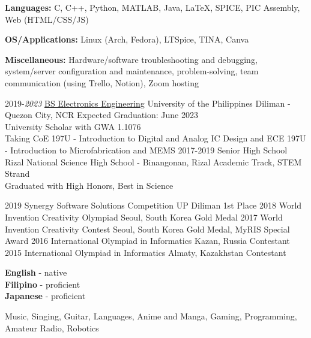 \documentclass[9pt]{developercv}
\begin{document}
\begin{minipage}[t]{0.475\textwidth} 
	\vspace{-\baselineskip}


	\textbf{Languages:} C, C++, Python, MATLAB, Java, LaTeX, SPICE, PIC Assembly, Web (HTML/CSS/JS)

	\textbf{OS/Applications:} Linux (Arch, Fedora), LTSpice, TINA, Canva

	\textbf{Miscellaneous:} Hardware/software troubleshooting and debugging, system/server configuration and maintenance, problem-solving, team communication (using Trello, Notion), Zoom hosting

	
	\begin{entrylist}
		\entry
			{2019-\emph{2023}}
			{\href{https://www.eee.upd.edu.ph/undergraduate-programs/bs-electronics-and-communications-engineering}{BS Electronics Engineering}}
			{University of the Philippines Diliman - Quezon City, NCR}
			{Expected Graduation: June 2023\\
			University Scholar with GWA 1.1076\\
			Taking CoE 197U - Introduction to Digital and Analog IC Design and ECE 197U - Introduction to Microfabrication and MEMS}
		\entry
			{2017-2019}
			{Senior High School}
			{Rizal National Science High School - Binangonan, Rizal}
			{Academic Track, STEM Strand\\
			Graduated with High Honors, Best in Science}
	\end{entrylist}
	\cvsect{Achievements}
	\begin{entrylist}
		\entry
			{2019}
			{Synergy Software Solutions Competition}
			{UP Diliman}
			{1st Place}
		\entry
			{2018}
			{World Invention Creativity Olympiad}
			{Seoul, South Korea}
			{Gold Medal}
		\entry
			{2017}
			{World Invention Creativity Contest}
			{Seoul, South Korea}
			{Gold Medal, MyRIS Special Award}
		\entry
			{2016}
			{International Olympiad in Informatics}
			{Kazan, Russia}
			{Contestant}
		\entry
			{2015}
			{International Olympiad in Informatics}
			{Almaty, Kazakhstan}
			{Contestant}
	\end{entrylist}
\end{minipage}

\vspace{0.5cm}

\begin{minipage}[t]{0.2\textwidth}
	\vspace{-\baselineskip}

	\textbf{English} - native\\
	\textbf{Filipino} - proficient\\
	\textbf{Japanese} - proficient\\
\end{minipage}
\hfill
\begin{minipage}[t]{0.6\textwidth}
	\vspace{-\baselineskip}
	
	Music, Singing, Guitar, Languages, Anime and Manga, Gaming, Programming, Amateur Radio, Robotics
\end{minipage}
\end{document}
